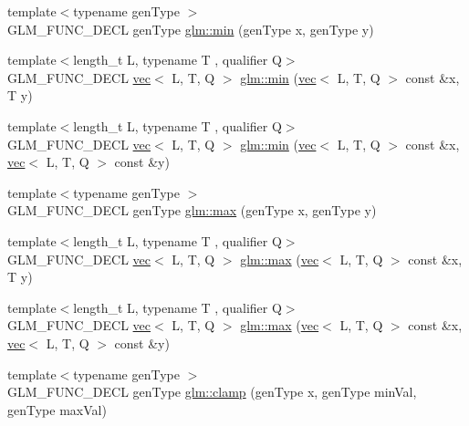 \begin{DoxyCompactItemize}
\item 
{\footnotesize template$<$typename gen\+Type $>$ }\\G\+L\+M\+\_\+\+F\+U\+N\+C\+\_\+\+D\+E\+CL gen\+Type \hyperlink{group__core__func__common_ga2c2bde1cec025b7ddff83c74a1113719}{glm\+::min} (gen\+Type x, gen\+Type y)
\item 
{\footnotesize template$<$length\+\_\+t L, typename T , qualifier Q$>$ }\\G\+L\+M\+\_\+\+F\+U\+N\+C\+\_\+\+D\+E\+CL \hyperlink{structglm_1_1vec}{vec}$<$ L, T, Q $>$ \hyperlink{group__core__func__common_ga2d274e8b537c173dba983331a2620736}{glm\+::min} (\hyperlink{structglm_1_1vec}{vec}$<$ L, T, Q $>$ const \&x, T y)
\item 
{\footnotesize template$<$length\+\_\+t L, typename T , qualifier Q$>$ }\\G\+L\+M\+\_\+\+F\+U\+N\+C\+\_\+\+D\+E\+CL \hyperlink{structglm_1_1vec}{vec}$<$ L, T, Q $>$ \hyperlink{group__core__func__common_ga734a374ca5c808e7bd9f74b6acfd7478}{glm\+::min} (\hyperlink{structglm_1_1vec}{vec}$<$ L, T, Q $>$ const \&x, \hyperlink{structglm_1_1vec}{vec}$<$ L, T, Q $>$ const \&y)
\item 
{\footnotesize template$<$typename gen\+Type $>$ }\\G\+L\+M\+\_\+\+F\+U\+N\+C\+\_\+\+D\+E\+CL gen\+Type \hyperlink{group__core__func__common_ga98caa7f95a94c86a86ebce893a45326c}{glm\+::max} (gen\+Type x, gen\+Type y)
\item 
{\footnotesize template$<$length\+\_\+t L, typename T , qualifier Q$>$ }\\G\+L\+M\+\_\+\+F\+U\+N\+C\+\_\+\+D\+E\+CL \hyperlink{structglm_1_1vec}{vec}$<$ L, T, Q $>$ \hyperlink{group__core__func__common_gae8b0964d30deabd0867b8d7ac44f067e}{glm\+::max} (\hyperlink{structglm_1_1vec}{vec}$<$ L, T, Q $>$ const \&x, T y)
\item 
{\footnotesize template$<$length\+\_\+t L, typename T , qualifier Q$>$ }\\G\+L\+M\+\_\+\+F\+U\+N\+C\+\_\+\+D\+E\+CL \hyperlink{structglm_1_1vec}{vec}$<$ L, T, Q $>$ \hyperlink{group__core__func__common_gad48b723358c68d45477c22ff0101985e}{glm\+::max} (\hyperlink{structglm_1_1vec}{vec}$<$ L, T, Q $>$ const \&x, \hyperlink{structglm_1_1vec}{vec}$<$ L, T, Q $>$ const \&y)
\item 
{\footnotesize template$<$typename gen\+Type $>$ }\\G\+L\+M\+\_\+\+F\+U\+N\+C\+\_\+\+D\+E\+CL gen\+Type \hyperlink{group__core__func__common_ga93bce26c7d80d30a62f5c508f8498a6c}{glm\+::clamp} (gen\+Type x, gen\+Type min\+Val, gen\+Type max\+Val)

\end{DoxyCompactItemize}
